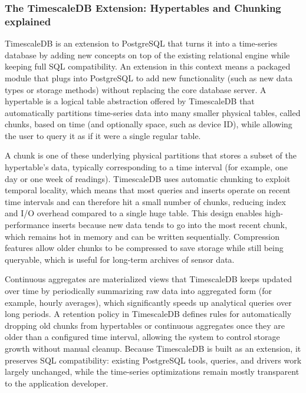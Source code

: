\subsubsection{The TimescaleDB Extension: Hypertables and Chunking explained}
TimescaleDB is an extension to PostgreSQL that turns it into a time-series database by adding new concepts on top of the existing relational engine while keeping full SQL compatibility. An extension in this context means a packaged module that plugs into PostgreSQL to add new functionality (such as new data types or storage methods) without replacing the core database server. A hypertable is a logical table abstraction offered by TimescaleDB that automatically partitions time-series data into many smaller physical tables, called chunks, based on time (and optionally space, such as device ID), while allowing the user to query it as if it were a single regular table.\cite{tigerdata_caggs_retention, so_timescaledb_size_retention, timescaledb_retention_caggs}

A chunk is one of these underlying physical partitions that stores a subset of the hypertable’s data, typically corresponding to a time interval (for example, one day or one week of readings). TimescaleDB uses automatic chunking to exploit temporal locality, which means that most queries and inserts operate on recent time intervals and can therefore hit a small number of chunks, reducing index and I/O overhead compared to a single huge table. This design enables high-performance inserts because new data tends to go into the most recent chunk, which remains hot in memory and can be written sequentially. Compression features allow older chunks to be compressed to save storage while still being queryable, which is useful for long-term archives of sensor data.\cite{so_timescaledb_size_retention, tigerdata_tsdb_vs_rdbms, tigerdata_caggs_retention}

Continuous aggregates are materialized views that TimescaleDB keeps updated over time by periodically summarizing raw data into aggregated form (for example, hourly averages), which significantly speeds up analytical queries over long periods. A retention policy in TimescaleDB defines rules for automatically dropping old chunks from hypertables or continuous aggregates once they are older than a configured time interval, allowing the system to control storage growth without manual cleanup. Because TimescaleDB is built as an extension, it preserves SQL compatibility: existing PostgreSQL tools, queries, and drivers work largely unchanged, while the time-series optimizations remain mostly transparent to the application developer.\cite{dbt_timescaledb_retention, timescaledb_retention_caggs, tigerdata_docs_caggs_retention, tigerdata_caggs_retention}

